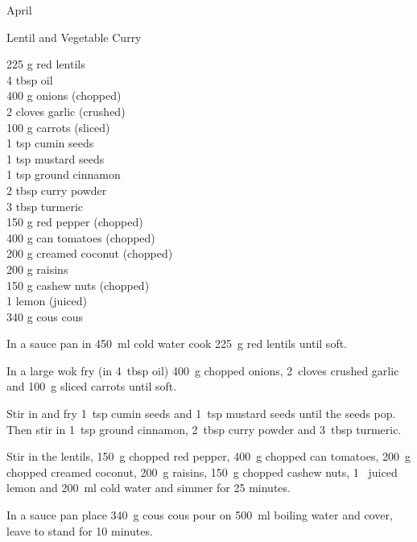 \begin{menu}{April}
    \begin{recipe}{2}{Lentil and Vegetable Curry}%
		\begin{ingredients}
		225 g red lentils  \\
	4 tbsp oil  \\
	400 g onions (chopped) \\
	2 cloves garlic (crushed) \\
	100 g carrots (sliced) \\
	1 tsp cumin seeds  \\
	1 tsp mustard seeds  \\
	1 tsp ground cinnamon  \\
	2 tbsp curry powder  \\
	3 tbsp turmeric  \\
	150 g red pepper (chopped) \\
	400 g can tomatoes (chopped) \\
	200 g creamed coconut (chopped) \\
	200 g raisins  \\
	150 g cashew nuts (chopped) \\
	1  lemon (juiced) \\
	340 g cous cous  \\
	
		\end{ingredients}
	
	
	
    \begin{instructions}
    \item 
        In a sauce pan in
        450~ml  cold water
        cook
        225~g  red lentils
        until soft.
      \item 
        In a large wok fry
        (in 4~tbsp  oil)
        400~g chopped onions,
        2~cloves crushed garlic
        and
        100~g sliced carrots
        until soft.
      \item 
        Stir in and fry
        1~tsp  cumin seeds
        and
        1~tsp  mustard seeds
        until the seeds pop.
        Then stir in
        1~tsp  ground cinnamon,
        2~tbsp  curry powder
        and
        3~tbsp  turmeric.
      \item 
        Stir in
        the lentils,
        150~g chopped red pepper,
        400~g chopped can tomatoes,
        200~g chopped creamed coconut,
        200~g  raisins,
        150~g chopped cashew nuts,
        1~ juiced lemon
        and
        200~ml  cold water
        and simmer for 25 minutes.
      \item 
    In a
    sauce pan
    place
    340~g  cous cous
    pour on
    500~ml  boiling water
    and cover, leave to stand for 10 minutes.
  

\end{instructions}
\end{recipe}
\end{menu}
